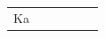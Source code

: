 \begin{table}[H]
\begin{tabular}{|l|p{2.5cm}|p{2.61cm}|p{2.61cm}|p{2.61cm}|p{2.61cm}|}
Ka
\end{tabular}
\end{table}
